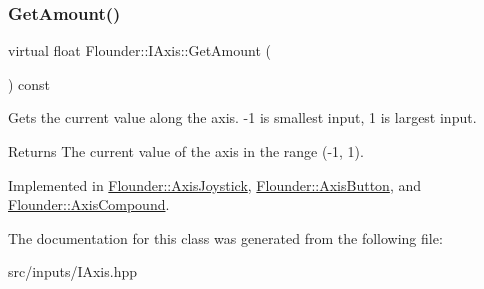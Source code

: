 \subsubsection{\texorpdfstring{Get\+Amount()}{GetAmount()}}
{\footnotesize\ttfamily virtual float Flounder\+::\+I\+Axis\+::\+Get\+Amount (\begin{DoxyParamCaption}{ }\end{DoxyParamCaption}) const\hspace{0.3cm}{\ttfamily [pure virtual]}}



Gets the current value along the axis. -\/1 is smallest input, 1 is largest input. 

\begin{DoxyReturn}{Returns}
The current value of the axis in the range (-\/1, 1). 
\end{DoxyReturn}


Implemented in \hyperlink{class_flounder_1_1_axis_joystick_a0464d3a7f1749bd27260d7fe3a8078f6}{Flounder\+::\+Axis\+Joystick}, \hyperlink{class_flounder_1_1_axis_button_af7ee21d3b33a7d0eadf6656fec5bdc29}{Flounder\+::\+Axis\+Button}, and \hyperlink{class_flounder_1_1_axis_compound_a9ce2015af606b6add617423ab21edc28}{Flounder\+::\+Axis\+Compound}.



The documentation for this class was generated from the following file\+:\begin{DoxyCompactItemize}
\item 
src/inputs/I\+Axis.\+hpp\end{DoxyCompactItemize}
